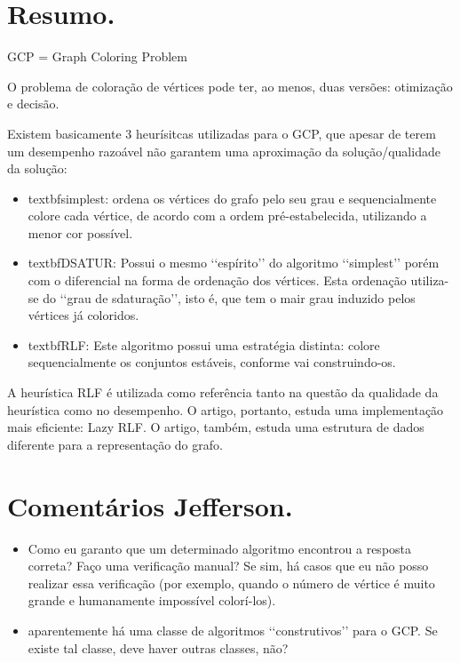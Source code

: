 \documentclass[a4paper,12pt]{article}
\begin{document}
\section{Resumo.}

GCP = Graph Coloring Problem

O problema de coloração de vértices pode ter, ao menos, duas versões: otimização e decisão.

Existem basicamente 3 heurísitcas utilizadas para o GCP, que apesar de terem um desempenho razoável não garantem uma aproximação da solução/qualidade da solução:

\begin{itemize}
\item textbf{simplest}: ordena os vértices do grafo pelo seu grau e sequencialmente colore cada vértice, de acordo com a ordem pré-estabelecida, utilizando a menor cor possível.
\item textbf{DSATUR}: Possui o mesmo \lq\lq{}espírito\rq\rq{} do algoritmo \lq\lq{}simplest\rq\rq{} porém com o diferencial na forma de ordenação dos vértices. Esta ordenação utiliza-se do \lq\lq{}grau de sdaturação\rq\rq{}, isto é, que tem o mair grau induzido pelos vértices já coloridos.
\item textbf{RLF}: Este algoritmo possui uma estratégia distinta: colore sequencialmente os conjuntos estáveis, conforme vai construindo-os.
\end{itemize}


A heurística RLF é utilizada como referência tanto na questão da qualidade da heurística como no desempenho. O artigo, portanto, estuda uma implementação mais eficiente: Lazy RLF. O artigo, também, estuda uma estrutura de dados diferente para a representação do grafo.

\section{Comentários Jefferson.}

\begin{itemize}
\item Como eu garanto que um determinado algoritmo encontrou a resposta correta? Faço uma verificação manual? Se sim, há casos que eu não posso realizar essa verificação (por exemplo, quando o número de vértice é muito grande e humanamente impossível colorí-los).
\item aparentemente há uma classe de algoritmos \lq\lq{}construtivos\rq\rq{} para o GCP. Se existe tal classe, deve haver outras classes, não?
\end{itemize}

\nocite{*}


\end{document}
